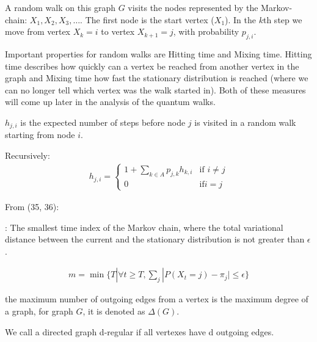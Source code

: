 A random walk on this graph $G$ visits the nodes represented by the Markov-chain: $X_1, X_2, X_3, \dots$. The first node is the start vertex ($X_1$). In the $k$th step we move from vertex $X_k=i$ to vertex $X_{k+1}=j$, with probability $p_{j,i}$.

Important properties for random walks are Hitting time and Mixing time. Hitting time describes how quickly can a vertex be reached from another vertex in the graph and Mixing time how fast the stationary distribution is reached (where we can no longer tell which vertex was the walk started in). Both of these measures will come up later in the analysis of the quantum walks.

 $h_{j,i}$ is the expected number of steps before node $j$ is visited in a random walk starting from node $i$.

Recursively:
\begin{align}
h_{j,i} = \left\{\begin{array}{lr}
1 + \sum\limits_{k\in{}A}p_{j,k}h_{k,i} & \text{if } i\neq{}j\\
0 & \text{if} i=j
\end{array}
\end{align}

From \cite{KempeIntroduction} (35, 36):

: The smallest time index of the Markov chain, where the total variational distance between the current and the stationary distribution is not greater than $\epsilon$.

\begin{align}
m = \min\{T | \forall{}t\geq{}T, \sum\limits_{j}|P(X_t = j) - \pi_j| \leq \epsilon\}
\end{align}


 the maximum number of outgoing edges from a vertex is the maximum degree of a graph, for graph $G$, it is denoted as $\Delta(G)$.

 We call a directed graph d-regular if all vertexes have d outgoing edges.
